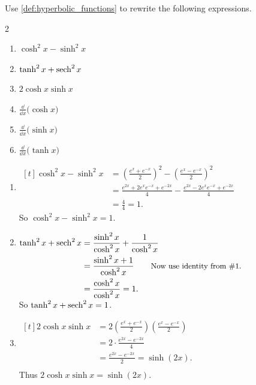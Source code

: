 \begin{example}\label{ex_hf1}%
Use \autoref{def:hyperbolic_functions} to rewrite the following expressions.
\begin{multicols}{2}
\begin{enumerate}
\item		$\cosh^2 x-\sinh^2x$
\item		$\tanh^2 x+\operatorname{sech}^2 x$
\item		$2\cosh x\sinh x$
\item		$\frac{\dd}{\dd x}\bigl(\cosh x\bigr)$
\item		$\frac{\dd}{\dd x}\bigl(\sinh x\bigr)$
\item		$\frac{\dd}{\dd x}\bigl(\tanh x\bigr)$
\end{enumerate}
\end{multicols}
\solution
\begin{enumerate}
\item \hfill$\begin{aligned}[t]
 \cosh^2x-\sinh^2x
 &= \left(\frac{e^x+e^{-x}}2\right)^2 -\left(\frac{e^x-e^{-x}}2\right)^2\\
 &= \frac{e^{2x}+2e^xe^{-x} + e^{-2x}}4 - \frac{e^{2x}-2e^xe^{-x} + e^{-2x}}4\\
 &= \frac44=1.
\end{aligned}$\hfill\null\\
So $\cosh^2 x-\sinh^2x=1$.

\item \hfill$\begin{aligned}[t]
 \tanh^2 x+\operatorname{sech}^2 x
 &=\frac{\sinh^2x}{\cosh^2 x} + \frac{1}{\cosh^2 x} \\
 &= \frac{\sinh^2x+1}{\cosh^2 x}\qquad \text{\small Now use identity from \#1.}\\
 &= \frac{\cosh^2 x}{\cosh^2 x} = 1.
\end{aligned}$\hfill\null\\
So $\tanh^2 x+\operatorname{sech}^2 x=1$.

\item \hfill$\begin{aligned}[t]
	2\cosh x\sinh x
	&= 2\left(\frac{e^x+e^{-x}}2\right)\left(\frac{e^x-e^{-x}}2\right) \\
	&= 2 \cdot\frac{e^{2x} - e^{-2x}}4\\
	&= \frac{e^{2x} - e^{-2x}}2 = \sinh (2x).\\
\end{aligned}$\hfill\null\\
Thus $2\cosh x\sinh x = \sinh (2x)$.


\end{enumerate}
\end{example}
